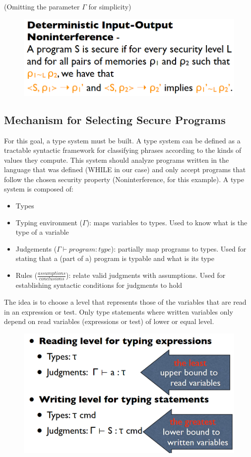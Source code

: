 \documentclass[10pt,a4paper]{report}
\begin{document}
(Omitting the parameter $\Gamma$ for simplicity)\\
\begin{figure}[H]
\centering
\includegraphics[scale=0.4]{20.png}
\end{figure}
\subsection{Mechanism for Selecting Secure Programs}
For this goal, a type system must be built. A type system can be defined as a tractable syntactic framework for classifying phrases according to the kinds of values they compute. This system should analyze programs written in the language that was defined (WHILE in our case) and only accept programs that follow the chosen security property (Noninterference, for this example). A type system is composed of:
\begin{itemize}
\item Types
\item Typing environment ($\Gamma$): maps variables to types. Used to know what is the type of a variable
\item Judgements ($\Gamma \vdash program:type$): partially map programs to types. Used for stating that a (part of a) program is typable and what is its type
\item Rules ($\frac{assumptions}{conclusions}$): relate valid judgments with assumptions. Used for establishing syntactic conditions for judgments to hold
\end{itemize}
The idea is to choose a level that represents those of the variables that are read in an expression or test. Only type statements where written variables only depend on read variables (expressions or test) of lower or equal level.
\begin{figure}[H]
\centering
\includegraphics[scale=0.4]{21.png}
\end{figure}
\end{document}
